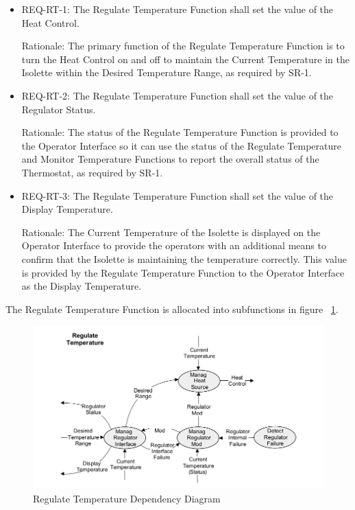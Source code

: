 \begin{itemize}
\item REQ-RT-1: The Regulate Temperature Function shall set the value of the Heat Control.

      Rationale: The primary function of the Regulate Temperature Function is to turn the
      Heat Control on and off to maintain the Current Temperature in the Isolette within the
      Desired Temperature Range, as required by SR-1.
\item REQ-RT-2: The Regulate Temperature Function shall set the value of the Regulator
      Status.

      Rationale: The status of the Regulate Temperature Function is provided to the Operator
      Interface so it can use the status of the Regulate Temperature and Monitor Temperature
      Functions to report the overall status of the Thermostat, as required by SR-1.
\item REQ-RT-3: The Regulate Temperature Function shall set the value of the Display
      Temperature.

      Rationale: The Current Temperature of the Isolette is displayed on the Operator Interface
      to provide the operators with an additional means to confirm that the Isolette is
      maintaining the temperature correctly. This value is provided by the Regulate
      Temperature Function to the Operator Interface as the Display Temperature.
\end{itemize}

The Regulate Temperature Function is allocated into subfunctions in figure ~\ref{fig:temp-dependency}.

\begin{figure}[ht]
  \centerline{\includegraphics[width=\textwidth]{figures/regulate-temperature-dependency.png}}
  \vspace{-.4cm}
  \caption{Regulate Temperature Dependency Diagram}
  \vspace{-.4cm}
 \label{fig:temp-dependency}
\end{figure}

